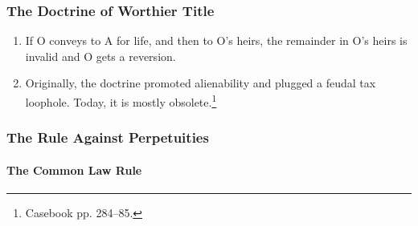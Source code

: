 \subsubsection{The Doctrine of Worthier Title}

\begin{enumerate}
    \item If O conveys to A for life, and then to O's heirs, the remainder in 
    O's heirs is invalid and O gets a reversion.
    \item Originally, the doctrine promoted alienability and plugged a feudal 
    tax loophole. Today, it is mostly obsolete.\footnote{Casebook pp. 
    284--85.}
\end{enumerate}

\subsubsection{The Rule Against Perpetuities}

\paragraph{The Common Law Rule}


